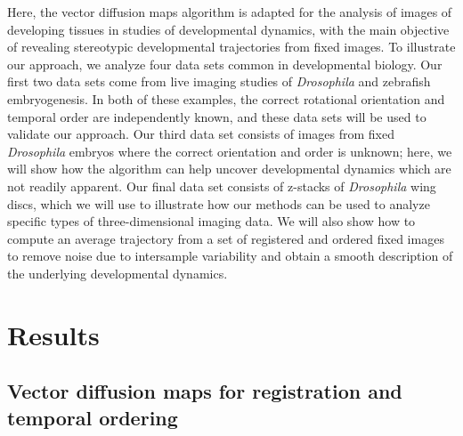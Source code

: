\documentclass[twocolumn, 10pt]{article}
\begin{document}
Here, the vector diffusion maps algorithm is adapted for the analysis of images of developing tissues in studies of developmental dynamics, with the main objective of revealing stereotypic developmental trajectories from fixed images.
%
To illustrate our approach, we analyze four data sets common in developmental biology.
%
Our first two data sets come from live imaging studies of {\em Drosophila} and zebrafish embryogenesis.
%
In both of these examples, the correct rotational orientation and temporal order are independently known, and these data sets will be used to validate our approach.
%
Our third data set consists of images from fixed {\em Drosophila} embryos where the correct orientation and order is unknown; here, we will show how the algorithm can help uncover developmental dynamics which are not readily apparent.
%
Our final data set consists of z-stacks of {\em Drosophila} wing discs, which we will use to illustrate how our methods can be used to analyze specific types of three-dimensional imaging data.
%
We will also show how to compute an average trajectory from a set of registered and ordered fixed images to remove noise due to intersample variability and obtain a smooth description of the underlying developmental dynamics.

\section*{Results}

\subsection*{Vector diffusion maps for registration and temporal ordering}
\end{document}
